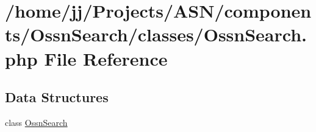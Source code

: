 \hypertarget{_ossn_search_8php}{}\section{/home/jj/\+Projects/\+A\+S\+N/components/\+Ossn\+Search/classes/\+Ossn\+Search.php File Reference}
\label{_ossn_search_8php}
\subsection*{Data Structures}
\begin{DoxyCompactItemize}
\item 
class \hyperlink{class_ossn_search}{Ossn\+Search}
\end{DoxyCompactItemize}
